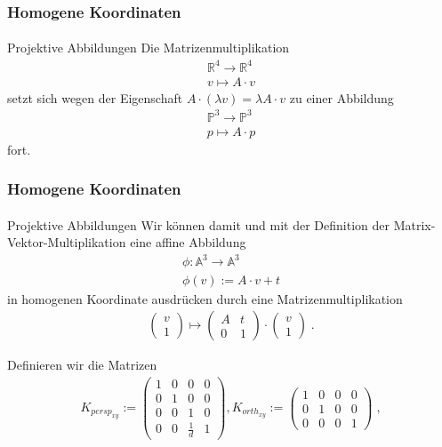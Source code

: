 \documentclass{beamer}
\begin{document}
\begin{frame}
    \frametitle{Homogene Koordinaten}
\framesubtitle{}
\begin{block}{Projektive Abbildungen}
Die Matrizenmultiplikation
\begin{align*}
\mathbb{R}^{4} \to \mathbb{R}^{4} \\
v \mapsto A \cdot v
\end{align*}
setzt sich wegen der Eigenschaft $A \cdot (\lambda v) = \lambda A \cdot v$ zu einer Abbildung
\begin{align*}
\mathbb{P}^{3} \to \mathbb{P}^{3} \\
p \mapsto A \cdot p
\end{align*}
fort. 
\end{block}
\end{frame}

\begin{frame}
    \frametitle{Homogene Koordinaten}
\framesubtitle{}
\begin{block}{Projektive Abbildungen}
Wir können damit und mit der Definition der Matrix-Vektor-Multiplikation eine affine Abbildung 
\begin{align*}
\phi : \mathbb{A}^{3} \to \mathbb{A}^{3} \\
\phi(v):=  A \cdot v + t
\end{align*}
in homogenen Koordinate ausdrücken durch eine Matrizenmultiplikation
\begin{align*}
\begin{pmatrix} v \\ 1\end{pmatrix} \mapsto \begin{pmatrix}  A  & t  \\ 0 &1\end{pmatrix} \cdot  \begin{pmatrix} v \\ 1\end{pmatrix}   \; .
\end{align*}
\end{block}
\end{frame}

Definieren wir die Matrizen
\begin{align*}
K_{persp_{xy}} := \begin{pmatrix}  
1   &  0 & 0 & 0  \\
0   &  1 & 0 & 0  \\
0   &  0 & 1 & 0  \\
0   &  0 & \frac{1}{d} & 1  
\end{pmatrix} ,
K_{orth_{xy}} := \begin{pmatrix}  
1   &  0 & 0 & 0  \\
0   &  1 & 0 & 0  \\
0   &  0 & 0 & 1  
\end{pmatrix} \; ,
\end{align*}
\end{document}
